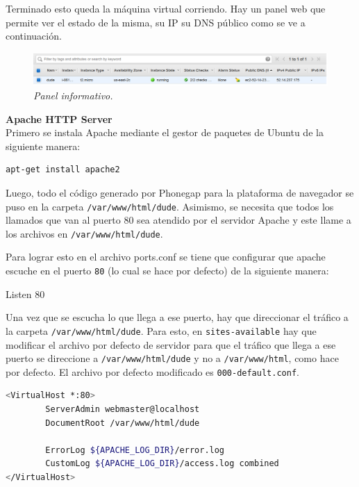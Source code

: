 Terminado esto queda la máquina virtual corriendo. Hay un panel web que permite ver el estado de la misma, su IP su DNS público como se ve a continuación. 

\begin{figure}[H]
  \centering
  \includegraphics[width=\textwidth, keepaspectratio]{images/AWS6}
  \caption{\textit{Panel informativo.}}
  \label{fig:AWS6}
\end{figure}

\textbf{Apache HTTP Server}\\
Primero se instala Apache mediante el gestor de paquetes de Ubuntu de la siguiente manera: 
\begin{lstlisting}[language=bash]
apt-get install apache2
\end{lstlisting}
Luego, todo el código generado por Phonegap para la plataforma de navegador se puso en la carpeta \lstinline[columns=fixed]{/var/www/html/dude}. Asimismo, se necesita que todos los llamados que van al puerto 80 sea atendido por el servidor Apache y este llame a los archivos en \lstinline[columns=fixed]{/var/www/html/dude}. 

Para lograr esto en el archivo ports.conf se tiene que configurar que apache escuche en el puerto \lstinline[columns=fixed]{80} (lo cual se hace por defecto) de la siguiente manera:

Listen 80

Una vez que se escucha lo que llega a ese puerto, hay que direccionar el tráfico a la carpeta \lstinline[columns=fixed]{/var/www/html/dude}. Para esto, en \lstinline[columns=fixed]{sites-available} hay que modificar el archivo por defecto de servidor para que el tráfico que llega a ese puerto se direccione a \lstinline[columns=fixed]{/var/www/html/dude} y no a \lstinline[columns=fixed]{/var/www/html}, como hace por defecto. El archivo por defecto modificado es \lstinline[columns=fixed]{000-default.conf}.

\begin{lstlisting}[language=bash]
<VirtualHost *:80>
        ServerAdmin webmaster@localhost
        DocumentRoot /var/www/html/dude

        ErrorLog ${APACHE_LOG_DIR}/error.log
        CustomLog ${APACHE_LOG_DIR}/access.log combined
</VirtualHost>
\end{lstlisting}

